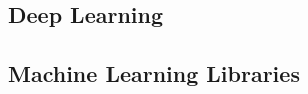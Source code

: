 
\subsection{Deep Learning}
\label{subsec:deep-learning}

\lipsum


\subsection{Machine Learning Libraries}
\label{subsec:ml-libraries}

\lipsum[1-5]